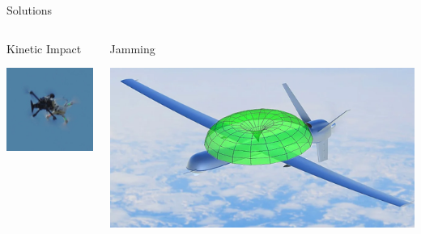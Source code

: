 \documentclass{beamer}
\begin{document}
    \begin{frame}{Solutions}
        \centering
        \begin{columns}
            \begin{column}{0.5\textwidth}
                \centering
                Kinetic Impact
                
                \vspace{10pt}
                \includegraphics[width=\textwidth]{figures/anduril_anvil.jpg}
            \end{column}
            \begin{column}{0.5\textwidth}
                \centering
                Jamming
                
                \vspace{10pt}
                \includegraphics[width=\textwidth]{figures/jamming_uav.png}
            \end{column}
        \end{columns}
    \end{frame}
\end{document}
